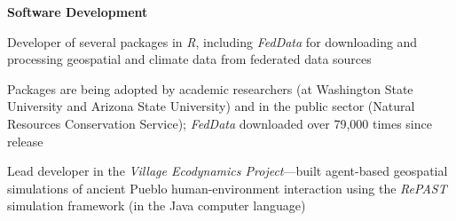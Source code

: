 {\bf Software Development}
\begin{bullet1}
\item Developer of several packages in \emph{R}, including \emph{FedData} for downloading and processing geospatial and climate data from federated data sources
\item Packages are being adopted by academic researchers (at Washington State University and Arizona State University) and in the public sector (Natural Resources Conservation Service); \emph{FedData} downloaded over 79,000 times since release
\item Lead developer in the \emph{Village Ecodynamics Project}---built agent-based geospatial simulations of ancient Pueblo human-environment interaction using the \emph{RePAST} simulation framework (in the Java computer language)
\end{bullet1}
%
%
